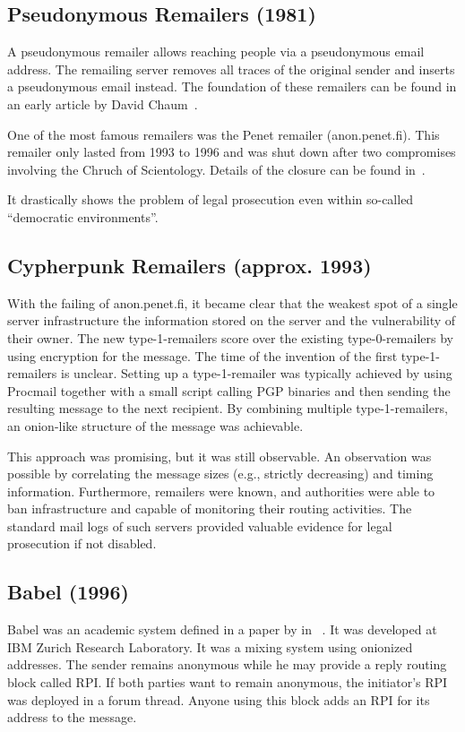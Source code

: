 \subsection{Pseudonymous Remailers (1981)\label{sec:remPseudo}}
A pseudonymous remailer allows reaching people via a pseudonymous email address. The remailing server removes all traces of the original sender and inserts a pseudonymous email instead. The foundation of these remailers can be found in an early article by David Chaum~\cite{CHAUM1}.

One of the most famous remailers was the Penet remailer (anon.penet.fi). This remailer only lasted from 1993 to 1996 and was shut down after two compromises involving the Chruch of Scientology. Details of the closure can be found in~\cite{penetClosure}.

It drastically shows the problem of legal prosecution even within so-called ``democratic environments''.

\subsection{Cypherpunk Remailers (approx. 1993)\label{sec:remCypherpunk}}
With the failing of anon.penet.fi, it became clear that the weakest spot of a single server infrastructure the information stored on the server and the vulnerability of their owner. The new type-1-remailers score over the existing type-0-remailers by using encryption for the message.  The time of the invention of the first type-1-remailers is unclear. Setting up a type-1-remailer was typically achieved by using Procmail together with a small script calling PGP binaries and then sending the resulting message to the next recipient. By combining multiple type-1-remailers, an onion-like structure of the message was achievable. 

This approach was promising, but it was still observable. An observation was possible by correlating the message sizes (e.g., strictly decreasing) and timing information. Furthermore, remailers were known, and authorities were able to ban infrastructure and capable of monitoring their routing activities. The standard mail logs of such servers provided valuable evidence for legal prosecution if not disabled.

\subsection{Babel (1996)}
Babel was an academic system defined in a paper by \citeauthor{babel} in \citeyear{babel}~\cite{babel}. It was developed at IBM Zurich Research Laboratory. It was a mixing system using onionized addresses. The sender remains anonymous while he may provide a reply routing block called RPI. If both parties want to remain anonymous, the initiator's RPI was deployed in a forum thread. Anyone using this block adds an RPI for its address to the message.

